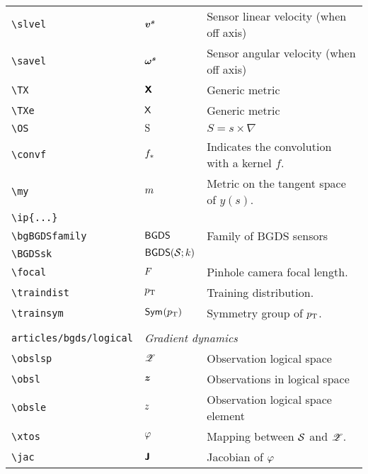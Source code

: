 \begin{longtable}{lll}
 {\color[rgb]{0.5,0.5,0.5}\texttt{\textbackslash slvel}} & $\boldsymbol{v^s}$ &  Sensor linear velocity (when off axis)\\ 
 {\color[rgb]{0.5,0.5,0.5}\texttt{\textbackslash savel}} & $\boldsymbol{\omega^s}$ &  Sensor angular velocity (when off axis)\\ 
 {\color[rgb]{0.5,0.5,0.5}\texttt{\textbackslash TX}} & $\boldsymbol{{\mathsf{X}}}$ &  Generic metric\\ 
 {\color[rgb]{0.5,0.5,0.5}\texttt{\textbackslash TXe}} & ${\mathsf{X}}$ &  Generic metric\\ 
 {\color[rgb]{0.5,0.5,0.5}\texttt{\textbackslash OS}} & $\mathrm{S}$ &  $S = s\times \nabla$\\ 
 {\color[rgb]{0.5,0.5,0.5}\texttt{\textbackslash convf}} & $f_\ast$ &  Indicates the convolution with a kernel $f$.\\ 
 {\color[rgb]{0.5,0.5,0.5}\texttt{\textbackslash my}} & $m$ &  Metric on the tangent space of $y(s)$.\\ 
 {\color[rgb]{0.5,0.5,0.5}\texttt{\textbackslash ip\{...\}}} &  & \\ 
 {\color[rgb]{0.5,0.5,0.5}\texttt{\textbackslash bgBGDSfamily}} & $\mathsf{BGDS}$ &  Family of BGDS sensors\\ 
 {\color[rgb]{0.5,0.5,0.5}\texttt{\textbackslash BGDSsk}} & $\BGDSsk$ & \\ 
 {\color[rgb]{0.5,0.5,0.5}\texttt{\textbackslash focal}} & $F$ &  Pinhole camera focal length.\\ 
 {\color[rgb]{0.5,0.5,0.5}\texttt{\textbackslash traindist}} & $p_\text{T}$ &  Training distribution.\\ 
 {\color[rgb]{0.5,0.5,0.5}\texttt{\textbackslash trainsym}} & ${\mathsf{Sym}^{}(p_\text{T})}$ &  Symmetry group of $p_\text{T}$.\\ 
  &  & \\ 
 {\color[rgb]{0.5,0.5,0.5}\texttt{articles/bgds/logical}} & \multicolumn{2}{l}{\emph{Gradient dynamics}}\\ 
 \hline
{\color[rgb]{0.5,0.5,0.5}\texttt{\textbackslash obslsp}} & $\mathscr{Z}$ &  Observation logical space\\ 
 {\color[rgb]{0.5,0.5,0.5}\texttt{\textbackslash obsl}} & $\boldsymbol{z}$ &  Observations in logical space\\ 
 {\color[rgb]{0.5,0.5,0.5}\texttt{\textbackslash obsle}} & $z$ &  Observation logical space element\\ 
 {\color[rgb]{0.5,0.5,0.5}\texttt{\textbackslash xtos}} & $\varphi$ &  Mapping between $\obsps$ and $\mathscr{Z}$.\\ 
 {\color[rgb]{0.5,0.5,0.5}\texttt{\textbackslash jac}} & $\boldsymbol{{\mathsf{J}}}$ &  Jacobian of $\varphi$\\ 

\end{longtable}
